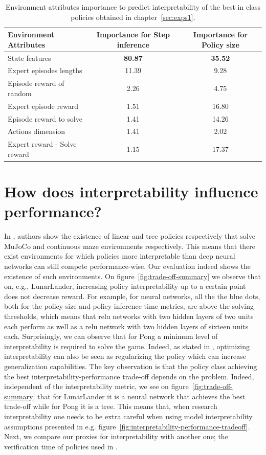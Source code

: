 \begin{table}
\centering
\small
\begin{tabular}{lcc}
\toprule
Environment Attributes & Importance for Step inference & Importance for Policy size \\
\midrule
State features & \textbf{80.87} & \textbf{35.52} \\
Expert episodes lengths & 11.39 & 9.28 \\
Episode reward of random & 2.26 & 4.75 \\
Expert episode reward & 1.51 & 16.80 \\
Episode reward to solve & 1.41 & 14.26 \\
Actions dimension & 1.41 & 2.02 \\
Expert reward - Solve reward & 1.15 & 17.37 \\
\bottomrule
\end{tabular}
\caption{Environment attributes importance to predict interpretability of the best in class policies obtained in chapter~\ref{sec:exps1}.}
\label{tab:combined_importance}
\end{table}

\section{How does interpretability influence performance?}
In \cite{random-search,theory1}, authors show the existence of linear and tree policies respectively that solve MuJoCo and continuous maze environments respectively.
This means that there exist environments for which policies more interpretable than deep neural networks can still compete performance-wise.
Our evaluation indeed shows the existence of such environments.
On figure~\ref{fig:trade-off-summary} we observe that on, e.g., LunarLander, increasing policy interpretability up to a certain point does not decrease reward.
For example, for neural networks, all the the blue dots, both for the policy size and policy inference time metrics, are above the solving thresholds, which means that relu networks with two hidden layers of two units each perform as well as a relu network with two hidden layers of sixteen units each. 
Surprisingly, we can observe that for Pong a minimum level of interpretability is required to solve the game.
Indeed, as stated in \cite{study-0}, optimizing interpretability can also be seen as regularizing the policy which can increase generalization capabilities. 
The key observation is that the policy class achieving the best interpretability-performance trade-off depends on the problem.
Indeed, independent of the interpretability metric, we see on figure~\ref{fig:trade-off-summary} that for LunarLander it is a neural network that achieves the best trade-off while for Pong it is a tree.
This means that, when research interpretability one needs to be extra careful when using model interpretability assumptions presented in e.g. figure~\ref{fig:interpretability-performance-tradeoff}.
Next, we compare our proxies for interpretability with another one; the verification time of policies used in \cite{viper,lens-complexity}.


